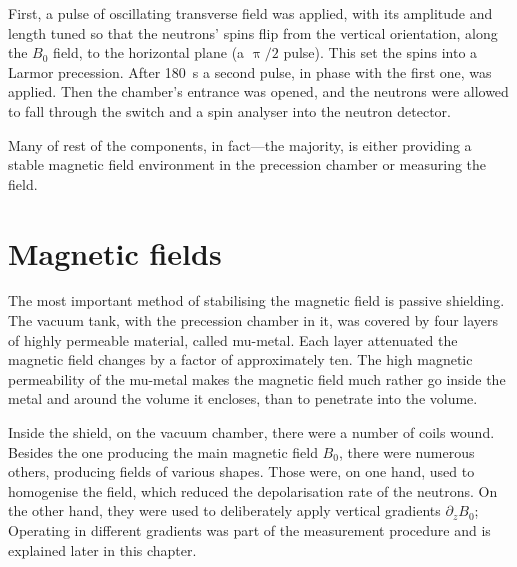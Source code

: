 First, a pulse of oscillating transverse field was applied, with its amplitude and length tuned so that the neutrons' spins flip from the vertical orientation, along the $B_0$ field, to the horizontal plane (a $\uppi/2$ pulse).
This set the spins into a Larmor precession.
After \SI{180}{\second} a second pulse, in phase with the first one, was applied. Then the chamber's entrance was opened, and the neutrons were allowed to fall through the switch and a spin analyser into the neutron detector.


Many of rest of the components, in fact---the majority, is either providing a stable magnetic field environment in the precession chamber or measuring the field.




\section{Magnetic fields}
The most important method of stabilising the magnetic field is passive shielding. The vacuum tank, with the precession chamber in it, was covered by four layers of highly permeable material, called mu-metal.
Each layer attenuated the magnetic field changes by a factor of approximately ten. The high magnetic permeability of the mu-metal makes the magnetic field much rather go inside the metal and around the volume it encloses, than to penetrate into the volume. 

Inside the shield, on the vacuum chamber, there were a number of coils wound. 
Besides the one producing the main magnetic field $B_0$, there were numerous others, producing fields of various shapes.
Those were, on one hand, used to homogenise the field, which reduced the depolarisation rate of the neutrons. On the other hand, they were used to deliberately apply vertical gradients $\partial_z B_0$; Operating in different gradients was part of the measurement procedure and is explained later in this chapter.

